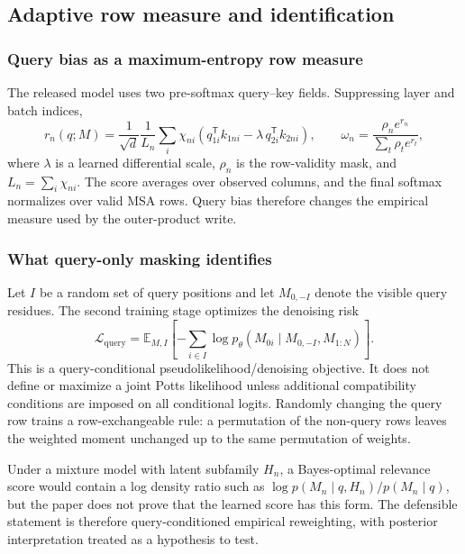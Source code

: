 \subsection{Adaptive row measure and identification}

\subsubsection{Query bias as a maximum-entropy row measure}

The released model uses two pre-softmax query--key fields.  Suppressing layer and batch indices,
\begin{equation}
r_n(q;M)
=\frac1{\sqrt d}\frac1{L_n}\sum_i\chi_{ni}
\left(q_{1i}^{\mathsf T}k_{1ni}
-\lambda\,q_{2i}^{\mathsf T}k_{2ni}\right),
\qquad
\omega_n=\frac{\rho_n e^{r_n}}{\sum_t\rho_t e^{r_t}},
\label{eq:msa-pairformer-differential-row-score}
\end{equation}
where $\lambda$ is a learned differential scale, $\rho_n$ is the row-validity mask, and
$L_n=\sum_i\chi_{ni}$.  The score averages over observed columns, and the final softmax normalizes
over valid MSA rows.  Query bias therefore changes the empirical measure used by the outer-product
write.

\subsubsection{What query-only masking identifies}

Let $I$ be a random set of query positions and let $M_{0,-I}$ denote the visible query residues.
The second training stage optimizes the denoising risk
\begin{equation}
\mathcal L_{\mathrm{query}}
=\mathbb E_{M,I}\left[-\sum_{i\in I}
\log p_\theta\!\left(M_{0i}\mid M_{0,-I},M_{1:N}\right)\right].
\label{eq:msa-pairformer-query-pseudolikelihood}
\end{equation}
This is a query-conditional pseudolikelihood/denoising objective.  It does not define or maximize
a joint Potts likelihood unless additional compatibility conditions are imposed on all conditional
logits.  Randomly changing the query row trains a row-exchangeable rule: a permutation of the
non-query rows leaves the weighted moment unchanged up to the same permutation of weights.

Under a mixture model with latent subfamily $H_n$, a Bayes-optimal relevance score would contain a
log density ratio such as $\log p(M_n\mid q,H_n)/p(M_n\mid q)$, but the paper does not prove that
the learned score has this form.  The defensible statement is therefore query-conditioned
empirical reweighting, with posterior interpretation treated as a hypothesis to test.

